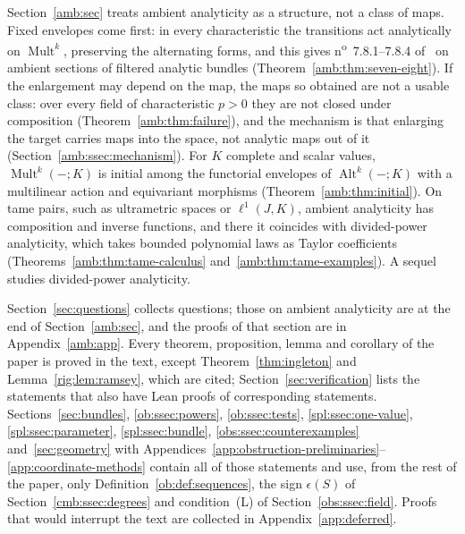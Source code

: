 \documentclass[11pt]{amsart}
\theoremstyle{definition}
\theoremstyle{remark}
\numberwithin{equation}{section}
\newcommand{\Alt}{\operatorname{Alt}}
\newcommand{\Mult}{\operatorname{Mult}}
\theoremstyle{plain}
\theoremstyle{definition}
\theoremstyle{plain}
\begin{document}
Section~\ref{amb:sec} treats ambient analyticity as a structure, not a class of maps. Fixed envelopes come first: in every
characteristic the transitions act analytically on $\Mult^k$, preserving the alternating forms, and this gives
n\textsuperscript{o}~7.8.1--7.8.4 of~\cite{Bou} on ambient sections of filtered analytic bundles
(Theorem~\ref{amb:thm:seven-eight}). If the enlargement may depend on the map, the maps so obtained are not a usable class:
over every field of characteristic $p>0$ they are not closed under composition (Theorem~\ref{amb:thm:failure}), and the
mechanism is that enlarging the target carries maps into the space, not analytic maps out of it
(Section~\ref{amb:ssec:mechanism}). For $K$ complete and scalar values, $\Mult^k(-;K)$ is initial among the functorial
envelopes of $\Alt^k(-;K)$ with a multilinear action and equivariant morphisms (Theorem~\ref{amb:thm:initial}). On tame
pairs, such as ultrametric spaces or $\ell^1(J,K)$, ambient analyticity has composition and inverse functions, and there it coincides with
divided-power analyticity, which takes bounded polynomial laws as Taylor coefficients
(Theorems~\ref{amb:thm:tame-calculus} and~\ref{amb:thm:tame-examples}). A sequel~\cite{II} studies divided-power
analyticity.

Section~\ref{sec:questions} collects questions; those on ambient analyticity are at the end of Section~\ref{amb:sec}, and
the proofs of that section are in Appendix~\ref{amb:app}. Every theorem, proposition, lemma and corollary of the paper is proved
in the text, except Theorem~\ref{thm:ingleton} and Lemma~\ref{rig:lem:ramsey}, which are cited;
Section~\ref{sec:verification} lists the statements that also have Lean proofs of corresponding statements.
Sections~\ref{sec:bundles}, \ref{ob:ssec:powers}, \ref{ob:ssec:tests}, \ref{spl:ssec:one-value},
\ref{spl:ssec:parameter}, \ref{spl:ssec:bundle}, \ref{obs:ssec:counterexamples} and~\ref{sec:geometry} with
Appendices~\ref{app:obstruction-preliminaries}--\ref{app:coordinate-methods} contain all of those statements and use, from
the rest of the paper, only Definition~\ref{ob:def:sequences}, the sign $\epsilon(S)$ of Section~\ref{cmb:ssec:degrees} and condition~\textup{(L)} of
Section~\ref{obs:ssec:field}. Proofs
that would interrupt the text are collected in Appendix~\ref{app:deferred}.
\end{document}
